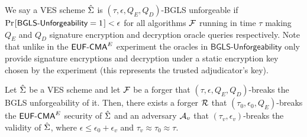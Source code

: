\begin{definition}
\label{original-unforgeability}

We say a VES scheme $\hat{\Sigma}$ is $(\tau, \epsilon, Q_E, Q_D)$-BGLS unforgeable if $\prob{\textsf{BGLS-Unforgeability} = 1} < \epsilon$ for all algorithms $\mathcal{F}$ running in time $\tau$ making $Q_E$ and $Q_D$ signature encryption and decryption oracle queries respectively.
Note that unlike in the $\textsf{EUF-CMA}^E$ experiment the oracles in $\textsf{BGLS-Unforgeability}$ only provide signature encryptions and decryption under a static encryption key chosen by the experiment (this represents the trusted adjudicator's key).

 \begin{center}
 \end{center}


\end{definition}

\begin{theorem}
  Let $\hat{\Sigma}$ be a VES scheme and let $\mathcal{F}$ be a forger that $(\tau, \epsilon, Q_E, Q_D)$-breaks the BGLS unforgeability of it.
  Then, there exists a forger $\mathcal{R}$ that $(\tau_0, \epsilon_0, Q_E)$-breaks the $\textsf{EUF-CMA}^E$ security of $\hat{\Sigma}$ and an adversary $\mathcal{A}_v$ that $(\tau_v, \epsilon_v)$-breaks the validity of $\hat{\Sigma}$, where $\epsilon \leq \epsilon_0 + \epsilon_v$ and $\tau_v \approx \tau_0 \approx \tau$.
\end{theorem}

